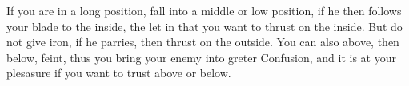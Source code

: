 \exercise{}

If you are in a long position, fall into a middle or low position, if
he then follows your blade to the inside, the let in that you want to
thrust on the inside. But do not give iron, if he parries, then thrust
on the outside. You can also above, then below, feint, thus you bring
your enemy into greter Confusion, and it is at your plesasure if you
want to trust above or below.
